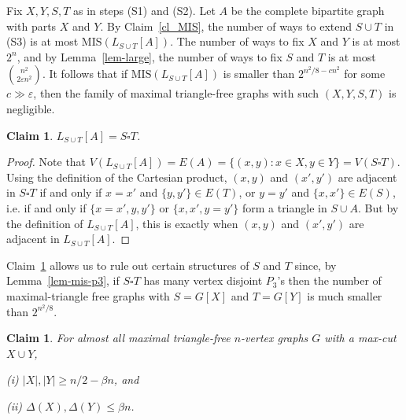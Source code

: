 \documentclass[12pt]{article}
\newtheorem{claim}[theorem]{Claim}
\theoremstyle{definition}
\theoremstyle{definition}
\theoremstyle{definition}
\theoremstyle{definition}
\theoremstyle{definition}
\theoremstyle{definition}
\theoremstyle{definition}
\newcommand{\ep}{\varepsilon}
\newcommand{\De}{\Delta}
\newcommand{\3}{\bf{3}}
\newcommand{\MIS}{\mathrm{MIS}}
\begin{document}
Fix $X,Y,S,T$ as in steps (S1) and (S2). Let $A$ be the complete bipartite graph with parts $X$ and $Y$. By Claim~\ref{cl_MIS}, the number of ways to extend $S\cup T$ in (S3) is at most $\MIS(L_{S\cup T}[A])$. The number of ways to fix $X$ and $Y$ is at most $2^n$, and by Lemma~\ref{lem-large}, the number of ways to fix $S$ and $T$ is at most $\binom{n^2}{2\ep n^2}$. It follows that if $\MIS(L_{S\cup T}[A])$ is smaller than $2^{n^2/8-cn^2}$ for some $c\gg\ep$, then the family of maximal triangle-free graphs with such $(X,Y,S,T)$ is negligible.

\begin{claim}\label{claim_L}
$L_{S\cup T}[A]=S\square T$.
\end{claim}

\begin{proof}
Note that $V(L_{S\cup T}[A])=E(A)=\{(x,y):x\in X, y\in Y\}=V(S\square T)$.
 Using the definition of the 
Cartesian product, $(x,y)$ and $(x',y')$ are adjacent in $S\square T$ if and only if $x=x'$ and $\{y,y'\}\in E(T)$, or $y=y'$ and $\{x,x'\}\in E(S)$, i.e. if and only if $\{x=x',y,y'\}$ or $\{x,x',y=y'\}$ form a triangle in $S\cup A$. But by the definition of $L_{S\cup T}[A]$, this is exactly when $(x,y)$ and $(x',y')$ are adjacent in $L_{S\cup T}[A]$. 
\end{proof}

Claim~\ref{claim_L} allows us to rule out certain structures of $S$ and $T$ since, by Lemma~\ref{lem-mis-p3}, if $S\square T$ has many vertex disjoint $P_3$'s then the number of maximal-triangle free graphs with $S=G[X]$ and $T=G[Y]$ is much smaller than $2^{n^2/8}$.

\begin{claim} \label{cl-XY}
For almost all maximal triangle-free $n$-vertex graphs $G$ with a max-cut $X\cup Y$, 

(i) $|X|, |Y|\geq n/2-\beta n$, and 

(ii) $\De(X), \De(Y)\le \beta n$. 
\end{claim}
\end{document}
